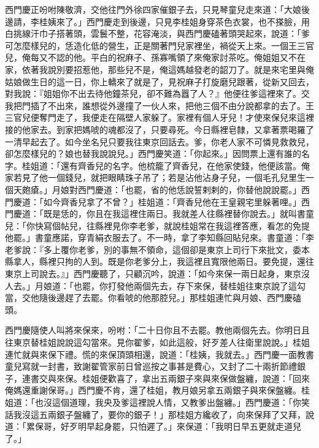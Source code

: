 西門慶正吩咐陳敬濟，交他往門外徐四家催銀子去，只見琴童兒走來道：「大娘後邊請，李桂姨來了。」西門慶走到後邊，只見李桂姐身穿茶色衣裳，也不搽臉，用白挑線汗巾子搭著頭，雲鬟不整，花容淹淡，與西門慶磕著頭哭起來，說道：「爹可怎麼樣兒的，恁造化低的營生，正是關著門兒家裡坐，禍從天上來。一個王三官兒，俺每又不認的他。平白的祝麻子、孫寡嘴領了來俺家討茶吃。俺姐姐又不在家，依著我說別要招惹他，那些兒不是，俺這媽越發老的韶刀了。就是來宅里與俺姑娘做生日的這一日，你上轎來了就是了，見祝麻子打旋磨兒跟著，從新又回去，對我說：『姐姐你不出去待他鐘茶兒，卻不難為囂了人？』他便往爹這裡來了。交我把門插了不出來，誰想從外邊撞了一伙人來，把他三個不由分說都拿的去了。王三官兒便奪門走了，我便走在隔壁人家躲了。家裡有個人牙兒！才使來保兒來這裡接的他家去。到家把媽唬的魂都沒了，只要尋死。今日縣裡皂隸，又拿著票喝羅了一清早起去了。如今坐名兒只要我往東京回話去。爹，你老人家不可憐見救救兒，卻怎麼樣兒的？娘也替我說說兒。」西門慶笑道：「你起來。」因問票上還有誰的名字。桂姐道：「還有齊香兒的名字。他梳籠了齊香兒，在他家使錢，他便該當。俺家若見了他一個錢兒，就把眼睛珠子吊了；若是沾他沾身子兒，一個毛孔兒里生一個天皰瘡。」月娘對西門慶道：「也罷，省的他恁說誓剌剌的，你替他說說罷。」西門慶道：「如今齊香兒拿了不曾？」桂姐道：「齊香兒他在王皇親宅里躲著哩。」西門慶道：「既是恁的，你且在我這裡住兩日。我就差人往縣裡替你說去。」就叫書童兒：「你快寫個帖兒，往縣裡見你李老爹，就說桂姐常在我這裡答應，看怎的免提他罷。」書童應諾，穿青絹衣服去了。不一時，拿了李知縣回貼兒來。書童道：「李老爹說：『多上覆你老爹，別的事無不領命，這個卻是東京上司行下來批文，委本縣拿人，縣裡只拘的人到。既是你老爹分上，我這裡且寬限他兩日。要免提，還往東京上司說去。』」西門慶聽了，只顧沉吟，說道：「如今來保一兩日起身，東京沒人去。」月娘道：「也罷，你打發他兩個先去，存下來保，替桂姐往東京說了這勾當，交他隨後邊趕了去罷。你看唬的他那腔兒。」那桂姐連忙與月娘、西門慶磕頭。

西門慶隨使人叫將來保來，吩咐：「二十日你且不去罷。教他兩個先去。你明日且往東京替桂姐說說這勾當來。見你翟爹，如此這般，好歹差人往衛里說說。」桂姐連忙就與來保下禮。慌的來保頂頭相還，說道：「桂姨，我就去。」西門慶一面教書童兒寫就一封書，致謝翟管家前日曾巡按之事甚是費心，又封了二十兩折節禮銀子，連書交與來保。桂姐便歡喜了，拿出五兩銀子來與來保做盤纏，說道：「回來俺媽還重謝保哥。」西門慶不肯，還了桂姐，教月娘另拿五兩銀子與來保盤纏。桂姐道：「也沒這個道理，我央及爹這裡說人情，又教爹出盤纏。」西門慶道：「你笑話我沒這五兩銀子盤纏了，要你的銀子！」那桂姐方纔收了，向來保拜了又拜，說道：「累保哥，好歹明早起身罷，只怕遲了。」來保道：「我明日早五更就走道兒了。」

